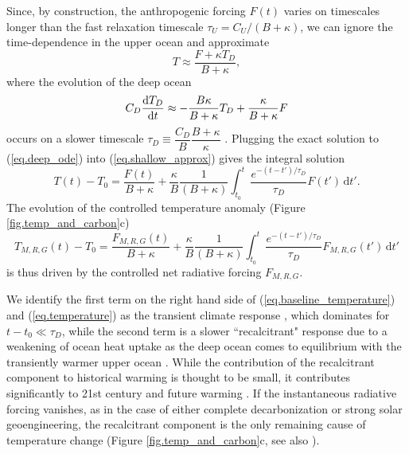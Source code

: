 \documentclass{article}
\begin{document}
Since, by construction, the anthropogenic forcing $F(t)$ varies on timescales longer than the fast relaxation timescale $\tau_{U} = C_{U}/(B + \kappa)$, we can ignore the time-dependence in the upper ocean and approximate
\begin{equation}
    T \approx \frac{F+\kappa T_{D}}{B + \kappa},
    \label{eq.shallow_approx}
\end{equation}
where the evolution of the deep ocean
\begin{equation}
    C_{D} \dv{T_{D}}{t} \approx - \frac{B \kappa}{B + \kappa} T_{D} + \frac{\kappa}{B + \kappa} F
    \label{eq.deep_ode}
\end{equation}
occurs on a slower timescale $\tau_{D} \equiv \dfrac{C_{D}}{B} \dfrac{B + \kappa}{\kappa}$ \citep{held_probing_2010}. Plugging the exact solution to (\ref{eq.deep_ode}) into (\ref{eq.shallow_approx}) gives the integral solution
\begin{equation}
    T(t) - T_{0} = \frac{F(t)}{B + \kappa} + \frac{\kappa}{B} \frac{1}{(B+\kappa)} \int_{t_{0}}^{t} \frac{ e^{-(t-t')/\tau_{D}}}{\tau_{D}} F(t') \, \text{d}t'.\label{eq.baseline_temperature}
\end{equation}
The evolution of the controlled temperature anomaly (Figure \ref{fig.temp_and_carbon}c)
\begin{equation}
    T_{M,R,G}(t) - T_{0} =  \frac{F_{M,R,G}(t)}{B + \kappa} + \frac{\kappa}{B} \frac{1}{(B+\kappa)} \int_{t_{0}}^{t} \frac{ e^{-(t-t')/\tau_{D}}}{\tau_{D}} F_{M,R,G}(t') \, \text{d}t'\label{eq.temperature}
\end{equation}
is thus driven by the controlled net radiative forcing $F_{M,R,G}$.

We identify the first term on the right hand side of (\ref{eq.baseline_temperature}) and (\ref{eq.temperature}) as the transient climate response \citep{gregory_transient_2008}, which dominates for $t-t_{0} \ll \tau_{D}$, while the second term is a slower ``recalcitrant" response due to a weakening of ocean heat uptake as the deep ocean comes to equilibrium with the transiently warmer upper ocean \citep{held_probing_2010}. While the contribution of the recalcitrant component to historical warming is thought to be small, it contributes significantly to 21st century and future warming \citep{gregory_transient_2008,held_probing_2010}. If the instantaneous radiative forcing vanishes, as in the case of either complete decarbonization or strong solar geoengineering, the recalcitrant component is the only remaining cause of temperature change (Figure \ref{fig.temp_and_carbon}c, see also \citealt{gregory_transient_2008, held_probing_2010}).
\end{document}
